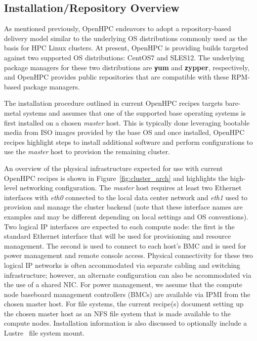 \documentclass{sig-alternate-05-2015}
\begin{document}
\subsection{Installation/Repository Overview}
\label{sec:repo_enable}

As mentioned previously, OpenHPC endeavors to adopt a repository-based delivery
model similar to the underlying OS distributions commonly used as the basis for HPC
Linux clusters.  At present, OpenHPC is providing builds targeted against two
supported OS distributions: CentOS7 and SLES12. The underlying package
managers for these two distributions are {\bf \texttt yum} and {\bf \texttt zypper},
respectively, and OpenHPC provides public repositories that are compatible with
these RPM-based package managers.

The installation procedure outlined in current OpenHPC recipes targets
bare-metal systems and assumes that one of the supported base operating systems
is first installed on a chosen {\em master} host. This is typically done
leveraging bootable media from ISO images provided by the base OS and once
installed, OpenHPC recipes highlight steps to install additional software and
perform configurations to use the {\em master} host to provision the remaining
cluster.

An overview of the physical infrastructure expected for use with
current OpenHPC recipes is shown in
Figure~\ref{fig:cluster_arch} and highlights the high-level networking
configuration. The {\em master} host requires at least two Ethernet interfaces
with {\em eth0} connected to the local data center network and {\em eth1} used
to provision and manage the cluster backend (note that these interface names
are examples and may be different depending on local settings and OS
conventions). Two logical IP interfaces are expected to each compute node: the
first is the standard Ethernet interface that will be used for provisioning and
resource management. The second is used to connect to each host's BMC and is
used for power management and remote console access. Physical connectivity for
these two logical IP networks is often accommodated via separate cabling and
switching infrastructure; however, an alternate configuration can also be
accommodated via the use of a shared NIC.
For power management, we assume that the compute node baseboard management
controllers (BMCs) are available via IPMI from the chosen master host. For file
systems, the current recipe(s) document setting up the chosen master
host as an NFS file system that is made available to the compute
nodes. Installation information is also discussed to optionally include a
Lustre~\cite{Lustre_url} file system mount.
\end{document}
